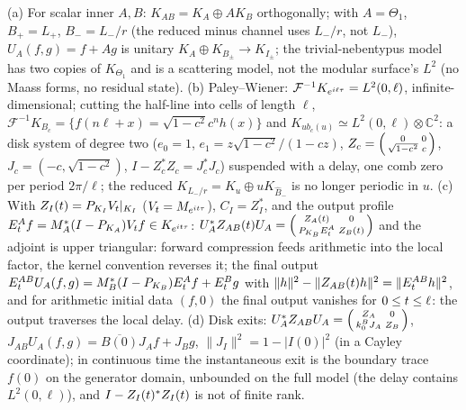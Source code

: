 \begin{theorem}
\label{thm:level-model-cascade}
(a) For scalar inner $A,B$: $K_{AB} = K_A\oplus AK_B$ orthogonally; with $A = \Theta_1$, $B_+ = L_+$, $B_- = L_-/r$ (the reduced minus
channel uses $L_-/r$, not $L_-$), $U_A(f,g) = f+Ag$ is unitary $K_A\oplus K_{B_\pm}\to K_{I_\pm}$; the trivial-nebentypus model has two
copies of $K_{\Theta_1}$ and is a scattering model, not the modular surface's $L^2$ (no Maass forms, no residual state).
(b) Paley--Wiener: $\mathcal F^{-1}K_{e^{i\ell\tau}} = L^2(0,\ell)$, infinite-dimensional; cutting the half-line into cells of length $\ell$,
$\mathcal F^{-1}K_{B_c} = \{f(n\ell+x) = \sqrt{1-c^2}c^nh(x)\}$ and $K_{ub_c(u)}\simeq L^2(0,\ell)\otimes\mathbb C^2$: a disk system of
degree two ($e_0 = 1$, $e_1 = z\sqrt{1-c^2}/(1-cz)$, $Z_c = \begin{psmallmatrix}0&0\\\sqrt{1-c^2}&c\end{psmallmatrix}$,
$J_c = (-c,\sqrt{1-c^2})$, $I-Z_c^{*}Z_c = J_c^{*}J_c$) suspended with a delay, one comb zero per period $2\pi/\ell$; the reduced
$K_{L_-/r} = K_u\oplus uK_{\hat B_-}$ is no longer periodic in $u$. (c) With $Z_I(t) = P_{K_I}V_t|_{K_I}$ ($V_t = M_{e^{it\tau}}$),
$C_I = Z_I^{*}$, and the output profile $E^A_t f = M_A^{*}(I-P_{K_A})V_t f\in K_{e^{it\tau}}$:
$U_A^{*}Z_{AB}(t)U_A = \begin{psmallmatrix}Z_A(t)&0\\P_{K_B}E^A_t&Z_B(t)\end{psmallmatrix}$ and the adjoint is upper triangular:
forward compression feeds arithmetic into the local factor, the kernel convention reverses it; the final output
$E^{AB}_t U_A(f,g) = M_B^{*}(I-P_{K_B})E^A_t f+E^B_t g$ with $\|h\|^2-\|Z_{AB}(t)h\|^2 = \|E^{AB}_t h\|^2$, and for arithmetic
initial data $(f,0)$ the final output vanishes for $0\le t\le\ell$: the output traverses the local delay. (d) Disk exits:
$U_A^{*}Z_{AB}U_A = \begin{psmallmatrix}Z_A&0\\k^B_0J_A&Z_B\end{psmallmatrix}$, $J_{AB}U_A(f,g) = \overline{B(0)}J_Af+J_Bg$, $\|J_I\|^2 = 1-|I(0)|^2$
(in a Cayley coordinate); in continuous time the instantaneous exit is the boundary trace $f(0)$ on the generator domain,
unbounded on the full model (the delay contains $L^2(0,\ell)$), and $I-Z_I(t)^{*}Z_I(t)$ is not of finite rank.
\end{theorem}

